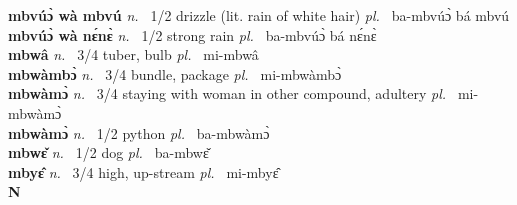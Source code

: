 {\bfseries mbvúɔ̀ wà mbvú}  {\itshape  n.~} 1/2 drizzle (lit. rain of white hair) {\itshape pl.~} ba-mbvúɔ̀ bá mbvú    \\ 
{\bfseries mbvúɔ̀ wà nɛ́nɛ̀}  {\itshape n.~} 1/2 strong rain {\itshape pl.~} ba-mbvúɔ̀ bá nɛ́nɛ̀    \\ 
{\bfseries mbwâ}  {\itshape n.~} 3/4 tuber, bulb {\itshape pl.~} mi-mbwâ    \\ 
{\bfseries mbwàmbɔ̀}  {\itshape n.~} 3/4 bundle, package {\itshape pl.~} mi-mbwàmbɔ̀    \\ 
{\bfseries mbwàmɔ̀}  {\itshape n.~} 3/4 staying with woman in other compound, adultery {\itshape pl.~} mi-mbwàmɔ̀    \\ 
{\bfseries mbwàmɔ̀}  {\itshape n.~} 1/2 python {\itshape pl.~} ba-mbwàmɔ̀    \\ 
{\bfseries mbwɛ̌}  {\itshape n.~} 1/2 dog {\itshape pl.~} ba-mbwɛ̌    \\ 
{\bfseries mbyɛ̂}  {\itshape n.~} 3/4 high, up-stream {\itshape pl.~} mi-mbyɛ̂    \\ 

\medskip
\noindent \large {\bfseries N}\normalsize\\
\medskip

